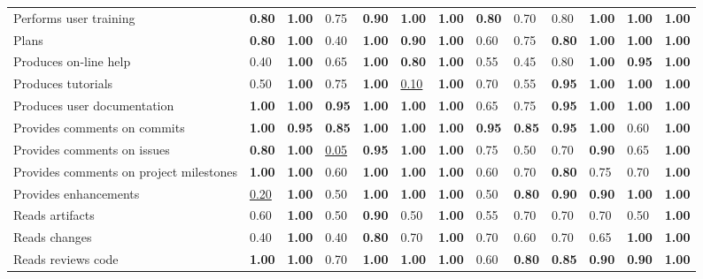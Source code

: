 \begin{tabular}{lllllllllllll}
Performs user training & \textbf{0.80} & \textbf{1.00} & 0.75 & \textbf{0.90} & \textbf{1.00} & \textbf{1.00} & \textbf{0.80} & 0.70 & 0.80 & \textbf{1.00} & \textbf{1.00} & \textbf{1.00} \\
Plans & \textbf{0.80} & \textbf{1.00} & 0.40 & \textbf{1.00} & \textbf{0.90} & \textbf{1.00} & 0.60 & 0.75 & \textbf{0.80} & \textbf{1.00} & \textbf{1.00} & \textbf{1.00} \\
Produces on-line help & 0.40 & \textbf{1.00} & 0.65 & \textbf{1.00} & \textbf{0.80} & \textbf{1.00} & 0.55 & 0.45 & 0.80 & \textbf{1.00} & \textbf{0.95} & \textbf{1.00} \\
Produces tutorials & 0.50 & \textbf{1.00} & 0.75 & \textbf{1.00} & \underline{0.10} & \textbf{1.00} & 0.70 & 0.55 & \textbf{0.95} & \textbf{1.00} & \textbf{1.00} & \textbf{1.00} \\
Produces user documentation & \textbf{1.00} & \textbf{1.00} & \textbf{0.95} & \textbf{1.00} & \textbf{1.00} & \textbf{1.00} & 0.65 & 0.75 & \textbf{0.95} & \textbf{1.00} & \textbf{1.00} & \textbf{1.00} \\
Provides comments on commits & \textbf{1.00} & \textbf{0.95} & \textbf{0.85} & \textbf{1.00} & \textbf{1.00} & \textbf{1.00} & \textbf{0.95} & \textbf{0.85} & \textbf{0.95} & \textbf{1.00} & 0.60 & \textbf{1.00} \\
Provides comments on issues & \textbf{0.80} & \textbf{1.00} & \underline{0.05} & \textbf{0.95} & \textbf{1.00} & \textbf{1.00} & 0.75 & 0.50 & 0.70 & \textbf{0.90} & 0.65 & \textbf{1.00} \\
Provides comments on project milestones & \textbf{1.00} & \textbf{1.00} & 0.60 & \textbf{1.00} & \textbf{1.00} & \textbf{1.00} & 0.60 & 0.70 & \textbf{0.80} & 0.75 & 0.70 & \textbf{1.00} \\
Provides enhancements & \underline{0.20} & \textbf{1.00} & 0.50 & \textbf{1.00} & \textbf{1.00} & \textbf{1.00} & 0.50 & \textbf{0.80} & \textbf{0.90} & \textbf{0.90} & \textbf{1.00} & \textbf{1.00} \\
Reads artifacts & 0.60 & \textbf{1.00} & 0.50 & \textbf{0.90} & 0.50 & \textbf{1.00} & 0.55 & 0.70 & 0.70 & 0.70 & 0.50 & \textbf{1.00} \\
Reads changes & 0.40 & \textbf{1.00} & 0.40 & \textbf{0.80} & 0.70 & \textbf{1.00} & 0.70 & 0.60 & 0.70 & 0.65 & \textbf{1.00} & \textbf{1.00} \\
Reads reviews code & \textbf{1.00} & \textbf{1.00} & 0.70 & \textbf{1.00} & \textbf{1.00} & \textbf{1.00} & 0.60 & \textbf{0.80} & \textbf{0.85} & \textbf{0.90} & \textbf{0.90} & \textbf{1.00} \\

\end{tabular}
